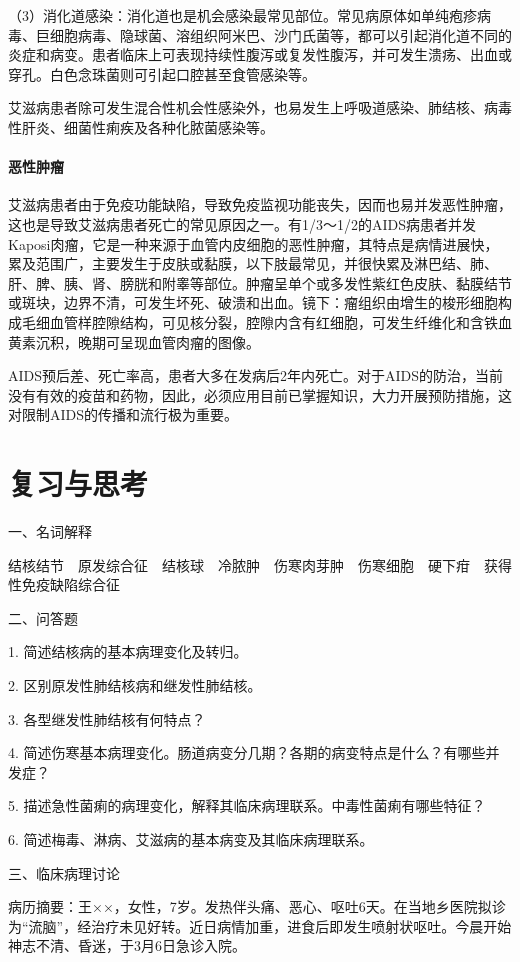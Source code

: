 （3）消化道感染：消化道也是机会感染最常见部位。常见病原体如单纯疱疹病毒、巨细胞病毒、隐球菌、溶组织阿米巴、沙门氏菌等，都可以引起消化道不同的炎症和病变。患者临床上可表现持续性腹泻或复发性腹泻，并可发生溃疡、出血或穿孔。白色念珠菌则可引起口腔甚至食管感染等。

艾滋病患者除可发生混合性机会性感染外，也易发生上呼吸道感染、肺结核、病毒性肝炎、细菌性痢疾及各种化脓菌感染等。

\paragraph{恶性肿瘤}
艾滋病患者由于免疫功能缺陷，导致免疫监视功能丧失，因而也易并发恶性肿瘤，这也是导致艾滋病患者死亡的常见原因之一。有1/3～1/2的AIDS病患者并发Kaposi肉瘤，它是一种来源于血管内皮细胞的恶性肿瘤，其特点是病情进展快，累及范围广，主要发生于皮肤或黏膜，以下肢最常见，并很快累及淋巴结、肺、肝、脾、胰、肾、膀胱和附睾等部位。肿瘤呈单个或多发性紫红色皮肤、黏膜结节或斑块，边界不清，可发生坏死、破溃和出血。镜下：瘤组织由增生的梭形细胞构成毛细血管样腔隙结构，可见核分裂，腔隙内含有红细胞，可发生纤维化和含铁血黄素沉积，晚期可呈现血管肉瘤的图像。

AIDS预后差、死亡率高，患者大多在发病后2年内死亡。对于AIDS的防治，当前没有有效的疫苗和药物，因此，必须应用目前已掌握知识，大力开展预防措施，这对限制AIDS的传播和流行极为重要。

\section*{复习与思考}

{一、名词解释}

结核结节　原发综合征　结核球　冷脓肿　伤寒肉芽肿　伤寒细胞　硬下疳　获得性免疫缺陷综合征

{二、问答题}

1. 简述结核病的基本病理变化及转归。

2. 区别原发性肺结核病和继发性肺结核。

3. 各型继发性肺结核有何特点？

4.
简述伤寒基本病理变化。肠道病变分几期？各期的病变特点是什么？有哪些并发症？

5. 描述急性菌痢的病理变化，解释其临床病理联系。中毒性菌痢有哪些特征？

6. 简述梅毒、淋病、艾滋病的基本病变及其临床病理联系。

{三、临床病理讨论}

病历摘要：王××，女性，7岁。发热伴头痛、恶心、呕吐6天。在当地乡医院拟诊为“流脑”，经治疗未见好转。近日病情加重，进食后即发生喷射状呕吐。今晨开始神志不清、昏迷，于3月6日急诊入院。

